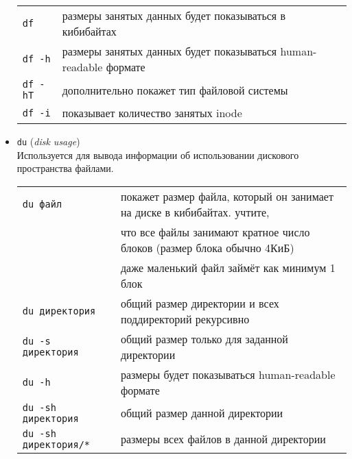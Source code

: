 \documentclass[10pt]{article}
\begin{document}
\begin{itemize}
\begin{tabular}{ p{3cm} | l }
\texttt{df} & размеры занятых данных будет показываться в кибибайтах\\
\texttt{df -h} & размеры занятых данных будет показываться human-readable формате\\
\texttt{df -hT} & дополнительно покажет тип файловой системы\\
\texttt{df -i} & показывает количество занятых inode\\
\end{tabular}

\item \texttt{du} (\textit{disk usage})\\
Используется для вывода информации об использовании дискового пространства файлами.

\begin{tabular}{ p{3.7cm} | l }
\texttt{du файл} & покажет размер файла, который он занимает на диске в кибибайтах. учтите, \\
                 & что все файлы занимают кратное число блоков (размер блока обычно 4КиБ)\\
				 & даже маленький файл займёт как минимум 1 блок\\ \hline
\texttt{du директория} & общий размер директории и всех поддиректорий рекурсивно\\
\texttt{du -s директория} & общий размер только для заданной директории\\ \hline
\texttt{du -h}   & размеры будет показываться human-readable формате\\ \hline
\texttt{du -sh директория} & общий размер данной директории\\
\texttt{du -sh директория/*} & размеры всех файлов в данной директории\\
\end{tabular}
\end{itemize}
\end{document}
